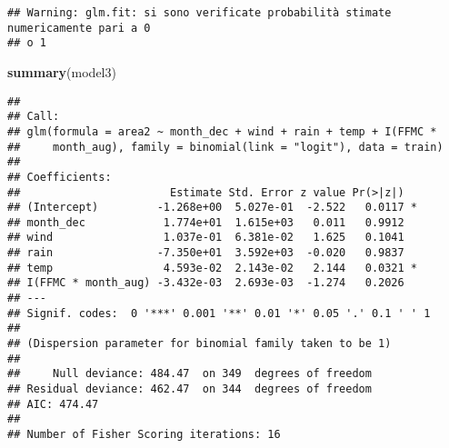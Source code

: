 \documentclass[
]{article}
\newenvironment{Shaded}{\begin{snugshade}}{\end{snugshade}}
\newcommand{\AttributeTok}[1]{\textcolor[rgb]{0.13,0.29,0.53}{#1}}
\newcommand{\CommentTok}[1]{\textcolor[rgb]{0.56,0.35,0.01}{\textit{#1}}}
\newcommand{\FloatTok}[1]{\textcolor[rgb]{0.00,0.00,0.81}{#1}}
\newcommand{\FunctionTok}[1]{\textcolor[rgb]{0.13,0.29,0.53}{\textbf{#1}}}
\newcommand{\NormalTok}[1]{#1}
\newcommand{\OtherTok}[1]{\textcolor[rgb]{0.56,0.35,0.01}{#1}}
\newcommand{\SpecialCharTok}[1]{\textcolor[rgb]{0.81,0.36,0.00}{\textbf{#1}}}
\newcommand{\StringTok}[1]{\textcolor[rgb]{0.31,0.60,0.02}{#1}}
\begin{document}
\begin{verbatim}
## Warning: glm.fit: si sono verificate probabilità stimate numericamente pari a 0
## o 1
\end{verbatim}

\begin{Shaded}
\begin{Highlighting}[]
\FunctionTok{summary}\NormalTok{(model3)}
\end{Highlighting}
\end{Shaded}

\begin{verbatim}
## 
## Call:
## glm(formula = area2 ~ month_dec + wind + rain + temp + I(FFMC * 
##     month_aug), family = binomial(link = "logit"), data = train)
## 
## Coefficients:
##                       Estimate Std. Error z value Pr(>|z|)  
## (Intercept)         -1.268e+00  5.027e-01  -2.522   0.0117 *
## month_dec            1.774e+01  1.615e+03   0.011   0.9912  
## wind                 1.037e-01  6.381e-02   1.625   0.1041  
## rain                -7.350e+01  3.592e+03  -0.020   0.9837  
## temp                 4.593e-02  2.143e-02   2.144   0.0321 *
## I(FFMC * month_aug) -3.432e-03  2.693e-03  -1.274   0.2026  
## ---
## Signif. codes:  0 '***' 0.001 '**' 0.01 '*' 0.05 '.' 0.1 ' ' 1
## 
## (Dispersion parameter for binomial family taken to be 1)
## 
##     Null deviance: 484.47  on 349  degrees of freedom
## Residual deviance: 462.47  on 344  degrees of freedom
## AIC: 474.47
## 
## Number of Fisher Scoring iterations: 16
\end{verbatim}

\begin{Shaded}
\end{Shaded}
\end{document}

